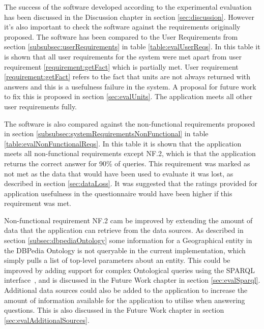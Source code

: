 \documentclass[authoryearcitations]{UoYCSproject}
\begin{document}
The success of the software developed according to the experimental evaluation has been discussed in the Discussion chapter in section \ref{sec:discussion}. However it's also important to check the software against the requirements originally proposed. The software has been compared to the User Requirements from section \ref{subsubsec:userRequirements} in table \ref{table:evalUserReqs}. In this table it is shown that all user requirements for the system were met apart from user requirement \ref{requirement:getFact} which is partially met. User requirement \ref{requirement:getFact} refers to the fact that units are not always returned with answers and this is a usefulness failure in the system. A proposal for future work to fix this is proposed in section \ref{sec:evalUnits}. The application meets all other user requirements fully.

The software is also compared against the non-functional requirements proposed in section \ref{subsubsec:systemRequirementsNonFunctional} in table \ref{table:evalNonFunctionalReqs}. In this table it is shown that the application meets all non-functional requirements except NF.2, which is that the application returns the correct answer for 90\% of queries. This requirement was marked as not met as the data that would have been used to evaluate it was lost, as described in section \ref{sec:dataLoss}. It was suggested that the ratings provided for application usefulness in the questionnaire would have been higher if this requirement was met.

Non-functional requirement NF.2 cam be improved by extending the amount of data that the application can retrieve from the data sources. As described in section \ref{subsec:dbpediaOntology} some information for a Geographical entity in the DBPedia Ontology is not queryable in the current implementation, which simply pulls a list of top-level parameters about an entity. This could be improved by adding support for complex Ontological queries using the SPARQL interface~\cite{dbPediaSparql}, and is discussed in the Future Work chapter in section \ref{sec:evalSparql}. Additional data sources could also be added to the application to increase the amount of information available for the application to utilise when answering questions. This is also discussed in the Future Work chapter in section \ref{sec:evalAdditionalSources}.
\end{document}
